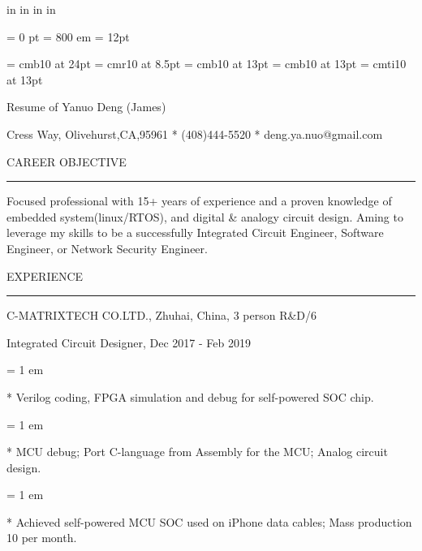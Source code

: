  in     %
 in    %
 in  %
 in  %


\nopagenumbers

\parindent = 0 pt
\emergencystretch = 800 em
\baselineskip = 12pt


\font\FFaa=      cmb10            at 24pt
\font\FFbb=      cmr10            at 8.5pt
\font\FFcc=      cmb10            at 13pt
\font\FFdd=      cmb10            at 13pt
\font\FFee=      cmti10           at 13pt


\bigbreak

\centerline{ \FFaa
Resume of Yanuo Deng (James)
}

\centerline{  Cress Way, Olivehurst,CA,95961
*
(408)444-5520
*
deng.ya.nuo@gmail.com
}

{ \medbreak } { \FFcc
CAREER OBJECTIVE
}

{ \smallbreak } {\par\noindent\hrule} { \smallbreak }

    Focused professional with 15+ years of experience 
and a proven knowledge of embedded system(linux/RTOS), 
and digital \& analogy circuit design. 
    Aming to leverage my skills to be a successfully 
Integrated Circuit Engineer, 
Software Engineer, 
or Network Security Engineer.

{ \medbreak } { \FFcc
EXPERIENCE
}
{ \smallbreak } {\par\noindent\hrule} { \smallbreak }

{ \medbreak } { \FFdd
C-MATRIXTECH CO.LTD., Zhuhai, China, 3 person R\&D/6
}

{ \FFee
Integrated Circuit Designer, Dec 2017 - Feb 2019
}

{ \parindent = 1 em \item{*} 
 Verilog coding, FPGA simulation and debug for self-powered SOC chip. 
}

{ \parindent = 1 em \item{*} 
 MCU debug; Port C-language from Assembly for the MCU; Analog circuit design.
}
{ \parindent = 1 em \item{*} 
 Achieved self-powered MCU SOC used on iPhone data cables; Mass production 10 per month.
}

